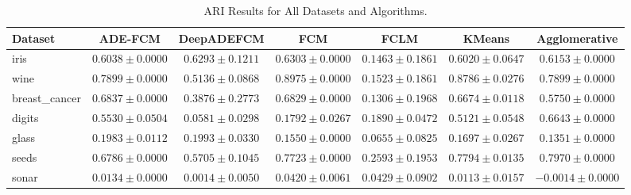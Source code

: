 \begin{table}[ht]
\centering
\caption{ARI Results for All Datasets and Algorithms.}
\label{tab:ari}
\begin{tabular}{lcccccc}
\toprule
Dataset & ADE-FCM & DeepADEFCM & FCM & FCLM & KMeans & Agglomerative \\
\midrule
iris & $0.6038\pm0.0000$ & $0.6293\pm0.1211$ & $0.6303\pm0.0000$ & $0.1463\pm0.1861$ & $0.6020\pm0.0647$ & $0.6153\pm0.0000$ \\
wine & $0.7899\pm0.0000$ & $0.5136\pm0.0868$ & $0.8975\pm0.0000$ & $0.1523\pm0.1861$ & $0.8786\pm0.0276$ & $0.7899\pm0.0000$ \\
breast_cancer & $0.6837\pm0.0000$ & $0.3876\pm0.2773$ & $0.6829\pm0.0000$ & $0.1306\pm0.1968$ & $0.6674\pm0.0118$ & $0.5750\pm0.0000$ \\
digits & $0.5530\pm0.0504$ & $0.0581\pm0.0298$ & $0.1792\pm0.0267$ & $0.1890\pm0.0472$ & $0.5121\pm0.0548$ & $0.6643\pm0.0000$ \\
glass & $0.1983\pm0.0112$ & $0.1993\pm0.0330$ & $0.1550\pm0.0000$ & $0.0655\pm0.0825$ & $0.1697\pm0.0267$ & $0.1351\pm0.0000$ \\
seeds & $0.6786\pm0.0000$ & $0.5705\pm0.1045$ & $0.7723\pm0.0000$ & $0.2593\pm0.1953$ & $0.7794\pm0.0135$ & $0.7970\pm0.0000$ \\
sonar & $0.0134\pm0.0000$ & $0.0014\pm0.0050$ & $0.0420\pm0.0061$ & $0.0429\pm0.0902$ & $0.0113\pm0.0157$ & $-0.0014\pm0.0000$ \\
\bottomrule
\end{tabular}
\end{table}
